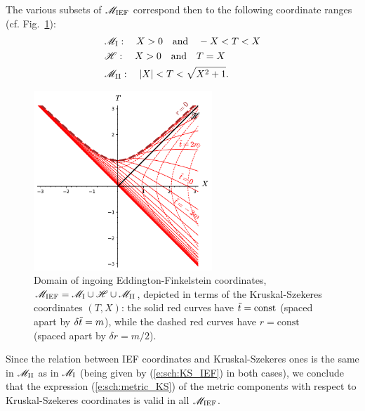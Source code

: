     \iff
\ee
The various subsets of $\mathscr{M}_{\rm IEF}$ correspond then to the following
coordinate ranges (cf. Fig.~\ref{f:sch:IEF_KS}):
\begin{subequations}
\label{e:max:range_TX_M_I_II}
\begin{align}
 & \mathscr{M}_{\rm I}: \quad X > 0 \quad\mbox{and}\quad -X < T < X \\
 & \mathscr{H}: \quad X > 0 \quad\mbox{and}\quad  T = X \\
 & \mathscr{M}_{\rm II}: \quad |X| < T < \sqrt{X^2+1} .
\end{align}
\end{subequations}

\begin{figure}
\centerline{\includegraphics[width=0.6\textwidth]{max_IEF_KS.pdf}}
\caption[]{\label{f:sch:IEF_KS} \footnotesize
Domain of ingoing Eddington-Finkelstein coordinates, $\mathscr{M}_{\rm IEF} = \mathscr{M}_{\rm I}\cup \mathscr{H}\cup \mathscr{M}_{\rm II}$, depicted in terms of the Kruskal-Szekeres coordinates $(T,X)$: the solid red
curves have ${\tilde t}=\mathrm{const}$ (spaced apart by $\delta{\tilde t} = m$), while the
dashed red curves have $r=\mathrm{const}$ (spaced apart by $\delta r = m/2$).}
\end{figure}


Since the relation between IEF coordinates and Kruskal-Szekeres ones is the
same in $\mathscr{M}_{\rm II}$ as in $\mathscr{M}_{\rm I}$ (being given by (\ref{e:sch:KS_IEF})
in both cases), we conclude that the expression (\ref{e:sch:metric_KS})
of the metric components with respect to
Kruskal-Szekeres coordinates is valid in all $\mathscr{M}_{\rm IEF}$.

